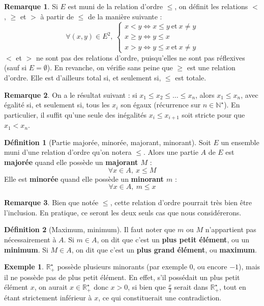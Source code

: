 \documentclass[french]{book}
\newcommand{\N}{\mathbb{N}}
\newcommand{\R}{\mathbb{R}}
\newcommand{\st}{^\star}
\theoremstyle{plain}
\theoremstyle{definition}
\newtheorem{dfn}{Définition}[chapter]
\newtheorem{exa}{Exemple}[chapter]
\newtheorem{rmq}{Remarque}[chapter]
\theoremstyle{remark}
\begin{document}
\begin{rmq}
	Si $E$ est muni de la relation d'ordre $\leqslant$, on définit les relations $<$, $\geqslant$ et $>$ à partir de $\leqslant$ de la manière suivante : $$\forall(x,y)\in E^2,\ \left \{ \begin{array}{lll} x<y \iff x\leqslant y \ \text{et} \ x\ne y \\ x\geqslant y\iff y\leqslant x \\ x>y \iff y\leqslant x \ \text{et} \ x\ne y\end{array}\right. $$ $<$ et $>$ ne sont pas des relations d'ordre, puisqu'elles ne sont pas réflexives (sauf si $E=\emptyset$). En revanche, on vérifie sans peine que $\geqslant$ est une relation d'ordre. Elle est d'ailleurs total si, et seulement si, $\leqslant$ est totale.
\end{rmq}
\begin{rmq}
	On a le résultat suivant : si $x_1\leqslant x_2\leqslant\ldots\leqslant x_n$, alors $x_1\leqslant x_n$, avec égalité si, et seulement si, tous les $x_i$ son égaux (récurrence sur $n\in\N\st$). En particulier, il suffit qu'une seule des inégalités $x_i\leqslant x_{i+1}$ soit stricte pour que $x_1<x_n$.
\end{rmq}
\begin{dfn}[Partie majorée, minorée, majorant, minorant]
	Soit $E$ un ensemble muni d'une relation d'ordre qu'on notera $\leqslant$. Alors une partie $A$ de $E$ est \textbf{majorée} quand elle possède un \textbf{majorant $M$} : $$\forall x\in A,\ x\leqslant M$$ Elle est \textbf{minorée} quand elle possède un \textbf{minorant $m$} : $$\forall x\in A,\ m\leqslant x$$
\end{dfn}
\begin{rmq}
	Bien que notée $\leqslant$, cette relation d'ordre pourrait très bien être l'inclusion. En pratique, ce seront les deux seuls cas que nous considérerons.
\end{rmq}
\begin{dfn}[Maximum, minimum]
	Il faut noter que $m$ ou $M$ n'appartient pas nécessairement à $A$. Si $m\in A$, on dit que c'est un \textbf{plus petit élément}, ou un \textbf{minimum}. Si $M\in A$, on dit que c'est un \textbf{plus grand élément}, ou \textbf{maximum}.
\end{dfn}
\begin{exa}
	$\R_+\st$ possède plusieurs minorants (par exemple $0$, ou encore $-1$), mais il ne possède pas de plus petit élément. En effet, s'il possédait un plus petit élément $x$, on aurait $x\in\R_+\st$ donc $x>0$, si bien que $\displaystyle \frac{x}{2}$ serait dans $\R_+\st$, tout en étant strictement inférieur à $x$, ce qui constituerait une contradiction.
\end{exa}
\end{document}
